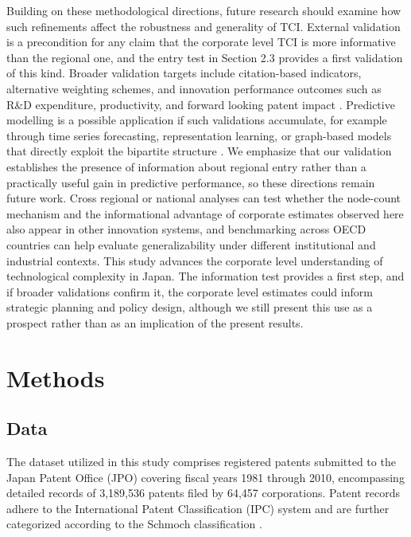 \documentclass[lineno,pdflatex,sn-mathphys-num]{sn-jnl}%
\theoremstyle{thmstyleone}%
\theoremstyle{thmstyletwo}%
\theoremstyle{thmstylethree}%
\begin{document}
Building on these methodological directions, future research should examine how such refinements affect the robustness and generality of TCI.
External validation is a precondition for any claim that the corporate level TCI is more informative than the regional one, and the entry test in Section 2.3 provides a first validation of this kind.
Broader validation targets include citation-based indicators, alternative weighting schemes, and innovation performance outcomes such as R\&D expenditure, productivity, and forward looking patent impact \cite{sweet2019patent, audretsch2021knowledge, mewes2022technological}.
Predictive modelling is a possible application if such validations accumulate, for example through time series forecasting, representation learning, or graph-based models that directly exploit the bipartite structure \cite{tacchella2023relatedness}.
We emphasize that our validation establishes the presence of information about regional entry rather than a practically useful gain in predictive performance, so these directions remain future work.
Cross regional or national analyses \cite{straccamore2023urban, straccamore2025comparative} can test whether the node-count mechanism and the informational advantage of corporate estimates observed here also appear in other innovation systems, and benchmarking across OECD countries can help evaluate generalizability under different institutional and industrial contexts.
This study advances the corporate level understanding of technological complexity in Japan.
The information test provides a first step, and if broader validations confirm it, the corporate level estimates could inform strategic planning and policy design, although we still present this use as a prospect rather than as an implication of the present results.

\section{Methods}\label{section:Methods}

\subsection{Data}\label{subsection:Data}

The dataset utilized in this study comprises registered patents submitted to the Japan Patent Office (JPO) covering fiscal years 1981 through 2010, encompassing detailed records of 3,189,536 patents filed by 64,457 corporations. Patent records adhere to the International Patent Classification (IPC) system and are further categorized according to the Schmoch classification \cite{Schmoch2008}.
\end{document}
